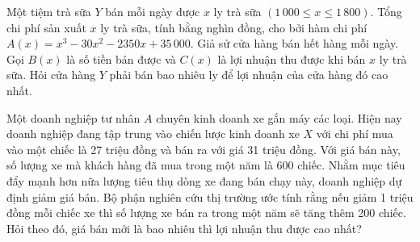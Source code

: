 \begin{ex}[Mức độ H]%
	Một tiệm trà sữa $Y$ bán mỗi ngày được $x$ ly trà sữa $(1\,000 \leq x \leq 1\,800)$. Tổng chi phí sản xuất $x$ ly trà sữa, tính bằng nghìn đồng, cho bởi hàm chi phí $A(x)=x^3-30x^2-2350x+35\,000$. Giả sử cửa hàng bán hết hàng mỗi ngày.	Gọi $B(x)$ là số tiền bán được và $C(x)$ là lợi nhuận thu được khi bán $x$ ly trà sữa. Hỏi cửa hàng $Y$ phải bán bao nhiêu ly để lợi nhuận của cửa hàng đó cao nhất.
\end{ex}

\begin{ex}%
	Một doanh nghiệp tư nhân $A$ chuyên kinh doanh xe gắn máy các loại. Hiện nay doanh nghiệp đang tập trung vào chiến lược kinh doanh xe $X$ với chi phí mua vào một chiếc là 27 triệu đồng và bán ra với giá 31 triệu đồng. Với giá bán này, số lượng xe mà khách hàng đã mua trong một năm là 600 chiếc. Nhằm mục tiêu đẩy mạnh hơn nữa lượng tiêu thụ dòng xe đang bán chạy này, doanh nghiệp dự định giảm giá bán. Bộ phận nghiên cứu thị trường ước tính rằng nếu giảm 1 triệu đồng mỗi chiếc xe thì số lượng xe bán ra trong một năm sẽ tăng thêm 200 chiếc. Hỏi theo đó, giá bán mới là bao nhiêu thì lợi nhuận thu được cao nhất?
	\par
\end{ex}

